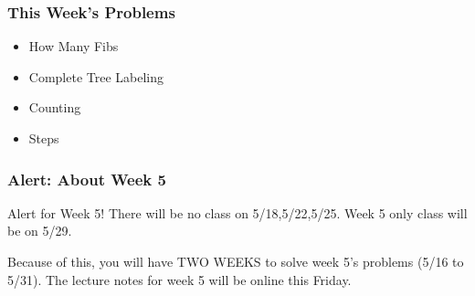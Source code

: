 \documentclass{beamer}
\begin{document}
\begin{frame}
  \frametitle{This Week's Problems}
  \begin{itemize}
  \item How Many Fibs
  \item Complete Tree Labeling
  \item Counting
  \item Steps
  \end{itemize}
\end{frame}

\begin{frame}
  \frametitle{Alert: About Week 5}
  \begin{alertblock}{Alert for Week 5!}
    There will be no class on \alert{5/18,5/22,5/25}. Week 5 only
    class will be on 5/29.
    
    \bigskip 
    
    Because of this, you will have TWO WEEKS to solve week 5's
    problems (5/16 to 5/31). The lecture notes for week 5 will be
    online this Friday.
  \end{alertblock}
\end{frame}
\end{document}
